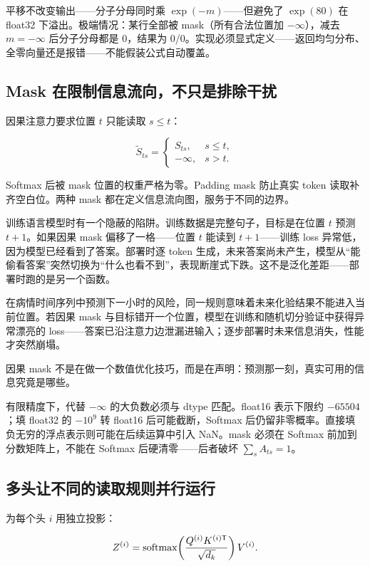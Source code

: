 平移不改变输出——分子分母同时乘 \(\exp(-m)\)——但避免了 \(\exp(80)\) 在 float32 下溢出。极端情况：某行全部被 mask（所有合法位置加 \(-\infty\)），减去 \(m=-\infty\) 后分子分母都是 0，结果为 0/0。实现必须显式定义——返回均匀分布、全零向量还是报错——不能假装公式自动覆盖。

\subsection{Mask 在限制信息流向，不只是排除干扰}

因果注意力要求位置 \(t\) 只能读取 \(s\le t\)：

\[
\widetilde S_{ts} = \begin{cases}
S_{ts}, & s\le t,\\
-\infty, & s>t.
\end{cases}
\]

Softmax 后被 mask 位置的权重严格为零。Padding mask 防止真实 token 读取补齐空白位。两种 mask 都在定义信息流向图，服务于不同的边界。

训练语言模型时有一个隐蔽的陷阱。训练数据是完整句子，目标是在位置 \(t\) 预测 \(t+1\)。如果因果 mask 偏移了一格——位置 \(t\) 能读到 \(t+1\)——训练 loss 异常低，因为模型已经看到了答案。部署时逐 token 生成，未来答案尚未产生，模型从``能偷看答案''突然切换为``什么也看不到''，表现断崖式下跌。这不是泛化差距——部署时跑的是另一个函数。

在病情时间序列中预测下一小时的风险，同一规则意味着未来化验结果不能进入当前位置。若因果 mask 与目标错开一个位置，模型在训练和随机切分验证中获得异常漂亮的 loss——答案已沿注意力边泄漏进输入；逐步部署时未来信息消失，性能才突然崩塌。

因果 mask 不是在做一个数值优化技巧，而是在声明：预测那一刻，真实可用的信息究竟是哪些。

有限精度下，代替 \(-\infty\) 的大负数必须与 dtype 匹配。float16 表示下限约 \(-65504\)；填 float32 的 \(-10^9\) 转 float16 后可能截断，Softmax 后仍留非零概率。直接填负无穷的浮点表示则可能在后续运算中引入 NaN。mask 必须在 Softmax 前加到分数矩阵上，不能在 Softmax 后硬清零——后者破坏 \(\sum_s A_{ts}=1\)。

\subsection{多头让不同的读取规则并行运行}

为每个头 \(i\) 用独立投影：

\[
Z^{(i)} = \operatorname{softmax}\!\left(\frac{Q^{(i)}K^{(i)\mathsf{T}}}{\sqrt{d_k}}\right)V^{(i)}.
\]

